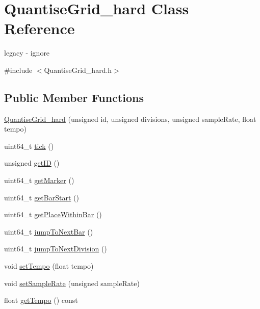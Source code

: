 \hypertarget{classQuantiseGrid__hard}{}\section{Quantise\+Grid\+\_\+hard Class Reference}
\label{classQuantiseGrid__hard}


legacy -\/ ignore  




{\ttfamily \#include $<$Quantise\+Grid\+\_\+hard.\+h$>$}

\subsection*{Public Member Functions}
\begin{DoxyCompactItemize}
\item 
\mbox{\hyperlink{classQuantiseGrid__hard_afd37064563533282cf9c6623cd1c89da}{Quantise\+Grid\+\_\+hard}} (unsigned id, unsigned divisions, unsigned sample\+Rate, float tempo)
\item 
uint64\+\_\+t \mbox{\hyperlink{classQuantiseGrid__hard_a0303c9a37394b191715fac5aafb51ea6}{tick}} ()
\item 
unsigned \mbox{\hyperlink{classQuantiseGrid__hard_adb1fb7070bc80b29e0922fc13b60cde7}{get\+ID}} ()
\item 
uint64\+\_\+t \mbox{\hyperlink{classQuantiseGrid__hard_adfaa53b529dab9d4b79fda98eee4c766}{get\+Marker}} ()
\item 
uint64\+\_\+t \mbox{\hyperlink{classQuantiseGrid__hard_ad2e99cf2fde8a376ff22bc8d755428d8}{get\+Bar\+Start}} ()
\item 
uint64\+\_\+t \mbox{\hyperlink{classQuantiseGrid__hard_a3e18e3f3d7bb65045acae775cc178530}{get\+Place\+Within\+Bar}} ()
\item 
uint64\+\_\+t \mbox{\hyperlink{classQuantiseGrid__hard_abf36a39ce079df7af84f6d027d0938c9}{jump\+To\+Next\+Bar}} ()
\item 
uint64\+\_\+t \mbox{\hyperlink{classQuantiseGrid__hard_aaa4293b31a9b83dd369d959021510951}{jump\+To\+Next\+Division}} ()
\item 
void \mbox{\hyperlink{classQuantiseGrid__hard_a0d56cd9876243687506a08e8044f177c}{set\+Tempo}} (float tempo)
\item 
void \mbox{\hyperlink{classQuantiseGrid__hard_abc6cae6bd566390974d8ea6f17d9ade5}{set\+Sample\+Rate}} (unsigned sample\+Rate)
\item 
float \mbox{\hyperlink{classQuantiseGrid__hard_a3a5bf0e2202368fa8b706126531086bb}{get\+Tempo}} () const

\end{DoxyCompactItemize}
